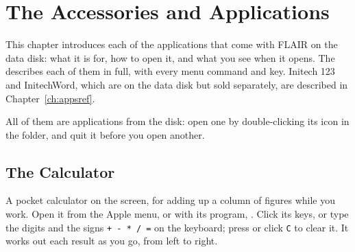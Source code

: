 \chapter{The Accessories and Applications}
\label{ch:accessories}

This chapter introduces each of the applications that come with FLAIR on
the data disk: what it is for, how to open it, and what you see when it
opens.  The  describes each of them in
full, with every menu command and key.  Initech 123 and InitechWord, which
are on the data disk but sold separately, are described in
Chapter~\ref{ch:appsref}.

All of them are applications from the disk: open one by double-clicking
its icon in the  folder, and quit it before you open another.

\section{The Calculator}
A pocket calculator on the screen, for adding up a column of figures
while you work.  Open it from the Apple menu, or
with its program, .  Click its keys, or type the digits
and the signs \texttt{+ - * / =} on the keyboard; press  or click
\texttt{C} to clear it.  It works out each result as you go, from left to
right.


